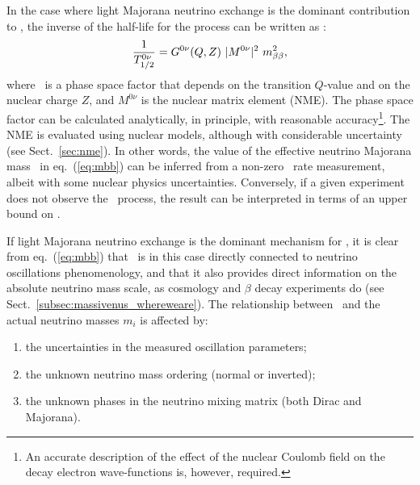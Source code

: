 In the case where light Majorana neutrino exchange is the dominant contribution to \bbonu, the inverse of the half-life for the process can be written as \cite{Doi:1985dx}:
%
\begin{equation}
\frac{1}{T^{0\nu}_{1/2}} = G^{0\nu}(Q,Z)\ \lvert M^{0\nu}\rvert^2\ m_{\beta\beta}^2,
\label{eq:Tonu}
\end{equation}
%
where \Gonu\ is a phase space factor that depends on the transition $Q$-value and on the nuclear charge $Z$, and $M^{0\nu}$ is the nuclear matrix element (NME). The phase space factor can be calculated analytically, in principle, with reasonable accuracy\footnote{An accurate description of the effect of the nuclear Coulomb field on the decay electron wave-functions is, however, required.}. The  NME is evaluated using nuclear models, although with considerable uncertainty (see Sect.~\ref{sec:nme}).
In other words, the value of the effective neutrino Majorana mass \mbb\ in eq.~(\ref{eq:mbb}) can be inferred from a non-zero \bbonu\ rate measurement, albeit with some nuclear physics uncertainties. Conversely, if a given experiment does not observe the \bbonu\ process, the result can be interpreted in terms of an upper bound on \mbb.  

If light Majorana neutrino exchange is the dominant mechanism for \bbonu, it is clear from eq.~(\ref{eq:mbb}) that \bbonu\ is in this case directly connected to neutrino oscillations phenomenology, and that it also provides direct information on the absolute neutrino mass scale, as cosmology and $\beta$ decay experiments do (see Sect.~\ref{subsec:massivenus_whereweare}). The relationship between \mbb\ and the actual neutrino masses $m_i$ is affected by:
%
\begin{enumerate}
\item the uncertainties in the measured oscillation parameters;
\item the unknown neutrino mass ordering (normal or inverted);
\item the unknown phases in the neutrino mixing matrix (both Dirac and Majorana). 
\end{enumerate}
%

